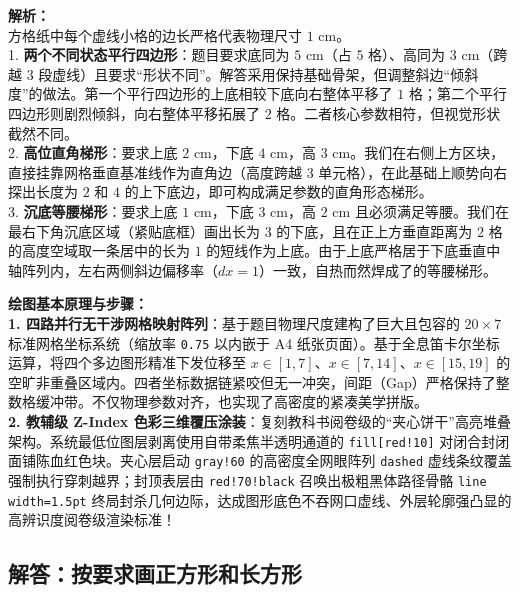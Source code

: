 {\small\color{gray}
\textbf{解析：}\\
方格纸中每个虚线小格的边长严格代表物理尺寸 $1\text{ cm}$。\\
1. \textbf{两个不同状态平行四边形}：题目要求底同为 $5\text{ cm}$（占 $5$ 格）、高同为 $3\text{ cm}$（跨越 $3$ 段虚线）且要求“形状不同”。解答采用保持基础骨架，但调整斜边“倾斜度”的做法。第一个平行四边形的上底相较下底向右整体平移了 $1$ 格；第二个平行四边形则剧烈倾斜，向右整体平移拓展了 $2$ 格。二者核心参数相符，但视觉形状截然不同。\\
2. \textbf{高位直角梯形}：要求上底 $2\text{ cm}$，下底 $4\text{ cm}$，高 $3\text{ cm}$。我们在右侧上方区块，直接挂靠网格垂直基准线作为直角边（高度跨越 $3$ 单元格），在此基础上顺势向右探出长度为 $2$ 和 $4$ 的上下底边，即可构成满足参数的直角形态梯形。\\
3. \textbf{沉底等腰梯形}：要求上底 $1\text{ cm}$，下底 $3\text{ cm}$，高 $2\text{ cm}$ 且必须满足等腰。我们在最右下角沉底区域（紧贴底框）画出长为 $3$ 的下底，且在正上方垂直距离为 $2$ 格的高度空域取一条居中的长为 $1$ 的短线作为上底。由于上底严格居于下底垂直中轴阵列内，左右两侧斜边偏移率（$dx=1$）一致，自热而然焊成了的等腰梯形。
}

\vspace{0.6cm}

{\small\color{blue!70!black}
\textbf{绘图基本原理与步骤：}\\
\textbf{1. 四路并行无干涉网格映射阵列}：基于题目物理尺度建构了巨大且包容的 $20 \times 7$ 标准网格坐标系统（缩放率 \texttt{0.75} 以内嵌于 A4 纸张页面）。基于全息笛卡尔坐标运算，将四个多边图形精准下发位移至 $x \in [1,7]$、$x \in [7,14]、x \in [15,19]$ 的空旷非重叠区域内。四者坐标数据链紧咬但无一冲突，间距（Gap）严格保持了整数格缓冲带。不仅物理参数对齐，也实现了高密度的紧凑美学拼版。\\
\textbf{2. 教辅级 Z-Index 色彩三维覆压涂装}：复刻教科书阅卷级的“夹心饼干”高亮堆叠架构。系统最低位图层剥离使用自带柔焦半透明通道的 \texttt{fill[red!10]} 对闭合封闭面铺陈血红色块。夹心层启动 \texttt{gray!60} 的高密度全网眼阵列 \texttt{dashed} 虚线条纹覆盖强制执行穿刺越界；封顶表层由 \texttt{red!70!black} 召唤出极粗黑体路径骨骼 \texttt{line width=1.5pt} 终局封杀几何边际，达成图形底色不吞网口虚线、外层轮廓强凸显的高辨识度阅卷级渲染标准！
}


\newpage

\newpage

\subsection{解答：按要求画正方形和长方形}

